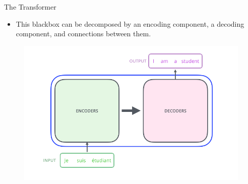 \documentclass[handout]{beamer}
\begin{document}
\begin{frame}{The Transformer}
\begin{scriptsize}
 \begin{itemize}
  \item  This blackbox can be decomposed by an encoding component, a decoding component, and connections between them.
 \end{itemize}

\end{scriptsize}



     \begin{figure}[h]
        	\includegraphics[scale = 0.29]{pics/The_transformer_encoders_decoders.png}
        \end{figure}  


\end{frame}
\end{document}
